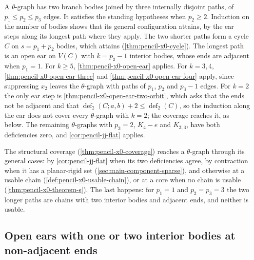 \begin{remark}
  \label{rem:pencil-x0-theta}
  A $\theta$-graph has two branch bodies joined by three internally
  disjoint paths, of $p_1 \le p_2 \le p_3$ edges. It satisfies the
  standing hypotheses when $p_2 \ge 2$. Induction on the number of bodies
  shows that its general configuration attains, by the ear steps along
  its longest path where they apply. The
  two shorter paths form a cycle $C$ on $s = p_1 + p_2$ bodies, which
  attains (\cref{thm:pencil-x0-cycle}). The longest path is
  an open ear on $V(C)$ with $k = p_3 - 1$ interior bodies, whose ends
  are adjacent when $p_1 = 1$. For $k \ge 5$,
  \cref{thm:pencil-x0-open-ear} applies. For $k = 3, 4$,
  \cref{thm:pencil-x0-open-ear-three} and
  \cref{thm:pencil-x0-open-ear-four} apply, since suppressing $x_2$
  leaves the $\theta$-graph with paths of $p_1$, $p_2$ and $p_3 - 1$
  edges. For $k = 2$ the only ear step is
  \cref{thm:pencil-x0-open-ear-two-orbit}, which asks that the ends not
  be adjacent and that $\operatorname{def}_2(C; a, b) + 2 \le
  \operatorname{def}_2(C)$, so the induction along the ear does not cover
  every $\theta$-graph with $k = 2$; the coverage reaches it, as below.
  The remaining $\theta$-graphs with $p_3 = 2$, $K_4 - e$ and
  $K_{2,3}$, have both deficiencies zero, and \cref{cor:pencil-jj-flat}
  applies.

  The structural coverage (\cref{thm:pencil-x0-coverage}) reaches a
  $\theta$-graph through its general cases: by \cref{cor:pencil-jj-flat}
  when its two deficiencies agree, by contraction when it has a
  planar-rigid set (\cref{sec:main-component-sparse}), and otherwise at a
  usable chain (\cref{def:pencil-x0-usable-chain}), or at a core when no
  chain is usable (\cref{thm:pencil-x0-theorem-s}). The last happens: for
  $p_1 = 1$ and $p_2 = p_3 = 3$ the two longer paths are chains with two
  interior bodies and adjacent ends, and neither is usable.
\end{remark}

\subsection{Open ears with one or two interior bodies at non-adjacent ends}
\label{sec:main-component-orbit}

